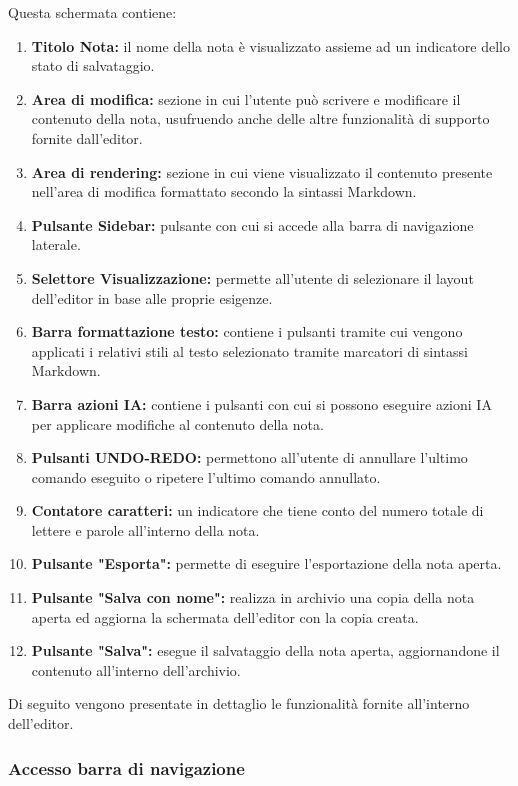\documentclass[a4paper,10pt]{article}
\begin{document}
Questa schermata contiene:
\begin{enumerate}
  \item \textbf{Titolo Nota:} il nome della nota è visualizzato assieme ad un indicatore dello stato di salvataggio.
  \item \textbf{Area di modifica:} sezione in cui l'utente può scrivere e modificare il contenuto della nota, usufruendo anche delle altre funzionalità di supporto fornite dall'editor.
  \item \textbf{Area di rendering:} sezione in cui viene visualizzato il contenuto presente nell'area di modifica formattato secondo la sintassi Markdown.
  \item \textbf{Pulsante Sidebar:} pulsante con cui si accede alla barra di navigazione laterale.
  \item \textbf{Selettore Visualizzazione:} permette all'utente di selezionare il layout dell'editor in base alle proprie esigenze.
  \item \textbf{Barra formattazione testo:} contiene i pulsanti tramite cui vengono applicati i relativi stili al testo selezionato tramite marcatori di sintassi Markdown.
  \item \textbf{Barra azioni IA:} contiene i pulsanti con cui si possono eseguire azioni IA per applicare modifiche al contenuto della nota.
  \item \textbf{Pulsanti UNDO-REDO:} permettono all'utente di annullare l'ultimo comando eseguito o ripetere l'ultimo comando annullato. 
  \item \textbf{Contatore caratteri:} un indicatore che tiene conto del numero totale di lettere e parole all'interno della nota.
  \item \textbf{Pulsante "Esporta":} permette di eseguire l'esportazione della nota aperta.
  \item \textbf{Pulsante "Salva con nome":} realizza in archivio una copia della nota aperta ed aggiorna la schermata dell'editor con la copia creata. 
  \item \textbf{Pulsante "Salva":} esegue il salvataggio della nota aperta, aggiornandone il contenuto all'interno dell'archivio.
\end{enumerate}

Di seguito vengono presentate in dettaglio le funzionalità fornite all'interno dell'editor.

  \subsubsection{Accesso barra di navigazione}
\end{document}

